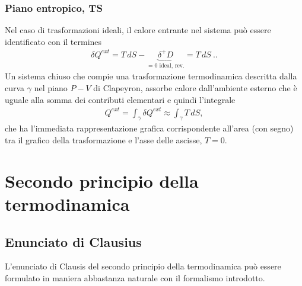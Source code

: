 \documentclass[letterpaper,10pt,italian]{jupyterBook}
\begin{document}
\subsubsection{Piano entropico, T\sphinxhyphen{}S}
\label{\detokenize{ch/thermodynamics/principles-phase-diagrams:piano-entropico-t-s}}
\sphinxAtStartPar
Nel caso di trasformazioni ideali, il calore entrante nel sistema può essere identificato con il termines
\begin{equation*}
\begin{split}\delta Q^{ext} = T \, d S - \underbrace{\delta^+ D}_{=0 \text{ ideal, rev.}} = T \, dS \ ..\end{split}
\end{equation*}
\sphinxAtStartPar
Un sistema chiuso che compie una trasformazione termodinamica descritta dalla curva \(\gamma\) nel piano \(P-V\) di Clapeyron, assorbe calore dall’ambiente esterno che è uguale alla somma dei contributi elementari \sphinxhyphen{} e quindi l’integrale
\begin{equation*}
\begin{split}Q^{ext} = \int_{\gamma} \delta Q^{ext} \approx \int_{\gamma} T \, d S ,\end{split}
\end{equation*}
\sphinxAtStartPar
che ha l’immediata rappresentazione grafica corrispondente all’area (con segno) tra il grafico della trasformazione e l’asse delle ascisse, \(T=0\).

\sphinxstepscope


\section{Secondo principio della termodinamica}
\label{\detokenize{ch/thermodynamics/principles-second:secondo-principio-della-termodinamica}}\label{\detokenize{ch/thermodynamics/principles-second:physics-hs-thermodynamics-foundation-principles-second}}\label{\detokenize{ch/thermodynamics/principles-second::doc}}

\subsection{Enunciato di Clausius}
\label{\detokenize{ch/thermodynamics/principles-second:enunciato-di-clausius}}
\sphinxAtStartPar
L’enunciato di Clausis del secondo principio della termodinamica può essere formulato in maniera abbastanza naturale con il formalismo introdotto.
\end{document}
